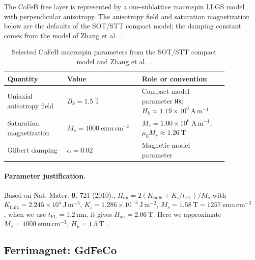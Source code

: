 The CoFeB free layer is represented by a one-sublattice macrospin LLGS model
with perpendicular anisotropy.  The anisotropy field and saturation magnetization
below are the defaults of the SOT/STT compact model; the damping constant comes from the model of Zhang et
al.~\cite{sot-stt-compact-model,zhang2024revisiting}.

\begin{table}[htbp]
    \centering
    \small
    \renewcommand{\arraystretch}{1.15}
    \begin{tabular}{p{0.25\linewidth}p{0.28\linewidth}p{0.36\linewidth}}
        \hline
        Quantity & Value                                     & Role or convention \\
        \hline
        Uniaxial anisotropy field
                 & $B_k=1.5\ \mathrm{T}$
                 & Compact-model parameter \texttt{Hk};
        $H_k\approx1.19\times10^6\ \mathrm{A\,m^{-1}}$                            \\
        Saturation magnetization
                 & $M_s=1000\ \mathrm{emu\,cm^{-3}}$
                 & $M_s=1.00\times10^6\ \mathrm{A\,m^{-1}}$;
        $\mu_0M_s\approx1.26\ \mathrm{T}$                                         \\
        Gilbert damping
                 & $\alpha=0.02$
                 & Magnetic model parameter                                       \\
        \hline
    \end{tabular}
    \caption{Selected CoFeB macrospin parameters from the SOT/STT compact model
        and Zhang et al.~\cite{sot-stt-compact-model,zhang2024revisiting}.}
    \label{tab:cofeb-parameters}
\end{table}

\paragraph{Parameter justification.}
Based on Nat. Mater. \textbf{9}, 721 (2010).,
$H_{\mathrm{an}}=2(K_{\mathrm{bulk}}+K_i/t_{\mathrm{FL}})/M_s$ with
$K_{\mathrm{bulk}}=2.245\times10^5\ \mathrm{J\,m^{-3}}$,
$K_i=1.286\times10^{-3}\ \mathrm{J\,m^{-2}}$,
$M_s=1.58\ \mathrm{T}=1257\ \mathrm{emu\,cm^{-3}}$, when we use
$t_{\mathrm{FL}}=1.2\ \mathrm{nm}$, it gives $H_{\mathrm{an}}=2.06\ \mathrm{T}$.
Here we approximate $M_s=1000\ \mathrm{emu\,cm^{-3}}$,
$H_k=1.5\ \mathrm{T}$~\cite{sot-stt-compact-model}.

\subsection{Ferrimagnet: GdFeCo}


